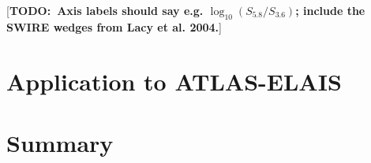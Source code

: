 \documentclass[fleqn,usenatbib,usedcolumn]{mnras}
\newcommand{\todo}[1]{ {\color{red}[{\bf TODO:~{#1}}]} }
\begin{document}
  \todo{Axis labels should say e.g. \(\log_{10}(S_{5.8}/S_{3.6})\);
  include the SWIRE wedges from Lacy et al. 2004.}

\section{Application to ATLAS-ELAIS}

\section{Summary}
%





\bsp	%
\label{lastpage}
\end{document}
